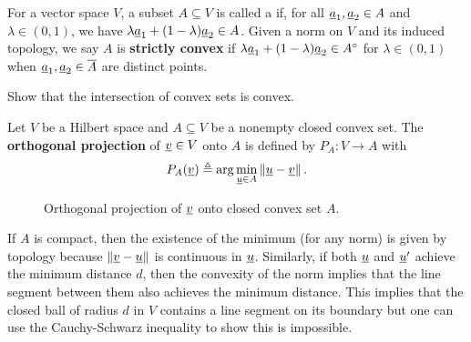 \begin{definition}
For a vector space $V$, a subset $A \subseteq V$ is called a  if, for all $\underline{a}_1,\underline{a}_2 \in A$ and $\lambda\in(0,1)$, we have $\lambda \underline{a}_1 + (1-\lambda) \underline{a}_2 \in A$.
Given a norm on $V$ and its induced topology, we say $A$ is \textbf{strictly convex} if $\lambda \underline{a}_1 + (1-\lambda) \underline{a}_2 \in {A}^{\circ}$ for $\lambda\in(0,1)$ when $\underline{a}_1,\underline{a}_2 \in \overline{A}$ are distinct points.
\end{definition}

\begin{problem}
Show that the intersection of convex sets is convex.
\end{problem}

\begin{definition}
Let $V$ be a Hilbert space and $A\subseteq V$ be a nonempty closed convex set. The \textbf{orthogonal projection} of $\underline{v} \in V$ onto $A$ is defined by $P_A \colon V \to A$ with
\[
P_A (\underline{v}) \triangleq \arg \min_{\underline u\in A}\left\Vert \underline u-\underline v\right\Vert. 
\]
\end{definition}

\begin{figure}[hbt]
\centering
{}
\caption{Orthogonal projection of $\underline{v}$ onto closed convex set $A$. \label{fig:pocs}}
\end{figure}

\begin{remark}
If $A$ is compact, then the existence of the minimum (for any norm) is given by topology because $\| \underline{v} - \underline{u} \|$ is continuous in $\underline{u}$.
Similarly, if both $\underline{u}$ and $\underline{u}'$ achieve the minimum distance $d$, then the convexity of the norm implies that the line segment between them also achieves the minimum distance. 
This implies that the closed ball of radius $d$ in $V$ contains a line segment on its boundary but one can use the Cauchy-Schwarz inequality to show this is impossible.
\end{remark}

